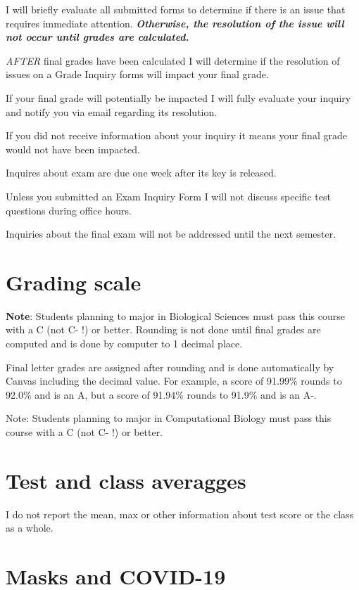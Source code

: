 \documentclass[
]{book}
\begin{document}
I will briefly evaluate all submitted forms to determine if there is an issue that requires immediate attention. \textbf{\emph{Otherwise, the resolution of the issue will not occur until grades are calculated.}}

\emph{AFTER} final grades have been calculated I will determine if the resolution of issues on a Grade Inquiry forms will impact your final grade.

If your final grade will potentially be impacted I will fully evaluate your inquiry and notify you via email regarding its resolution.

If you did not receive information about your inquiry it means your final grade would not have been impacted.

Inquires about exam are due one week after its key is released.

Unless you submitted an Exam Inquiry Form I will not discuss specific test questions during office hours.

Inquiries about the final exam will not be addressed until the next semester.

\hypertarget{grading-scale}{%
\chapter{Grading scale}\label{grading-scale}}

\textbf{Note}: Students planning to major in Biological Sciences must pass this course with a C (not C- !) or better. Rounding is not done until final grades are computed and is done by computer to 1 decimal place.

Final letter grades are assigned after rounding and is done automatically by Canvas including the decimal value. For example, a score of 91.99\% rounds to 92.0\% and is an A, but a score of 91.94\% rounds to 91.9\% and is an A-.

Note: Students planning to major in Computational Biology must pass this course with a C (not C- !) or better.

\hypertarget{test-and-class-averagges}{%
\chapter{Test and class averagges}\label{test-and-class-averagges}}

I do not report the mean, max or other information about test score or the class as a whole.

\hypertarget{masks-and-covid-19}{%
\chapter{Masks and COVID-19}\label{masks-and-covid-19}}
\end{document}
